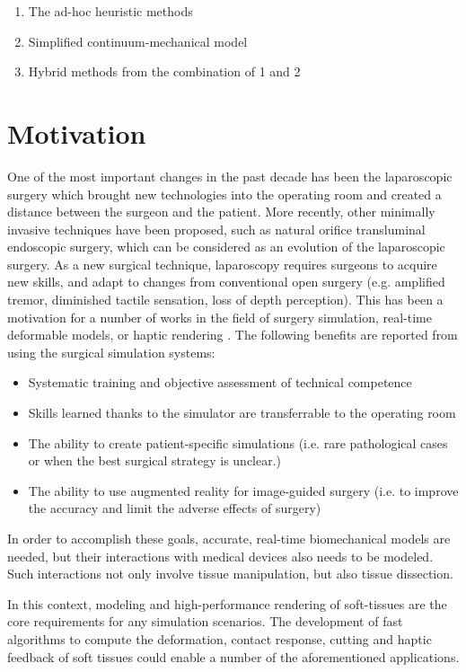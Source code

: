 \begin{enumerate}
 \item The ad-hoc heuristic methods
 \item Simplified continuum-mechanical model
 \item Hybrid methods from the combination of 1 and 2
\end{enumerate}

\section{Motivation}
One of the most important changes in the past decade has been the laparoscopic surgery which brought new technologies into the operating room and created a 
distance between the surgeon and the patient. More recently, other minimally invasive techniques have been proposed, such as natural orifice transluminal 
endoscopic surgery, which can be considered as an evolution of the laparoscopic surgery. As a new surgical technique, laparoscopy requires surgeons to acquire 
new skills, and adapt to changes from conventional open surgery (e.g. amplified tremor, diminished tactile sensation, loss of depth perception). This has been 
a motivation for a number of works in the field of surgery simulation, real-time deformable models, or haptic rendering \cite{Lin2004}. The following benefits are reported
from using the surgical simulation systems:

\begin{itemize}
 \item Systematic training and objective assessment of technical competence
 \item Skills learned thanks to the simulator are transferrable to the operating room
 \item The ability to create patient-specific simulations (i.e. rare pathological cases or when the best surgical strategy is unclear.)
 \item The ability to use augmented reality for image-guided surgery (i.e. to improve the accuracy and limit the adverse effects of surgery)
\end{itemize}

In order to accomplish these goals, accurate, real-time biomechanical models are needed, but their interactions with medical devices also needs to be modeled.
Such interactions not only involve tissue manipulation, but also tissue dissection. 

In this context, modeling and high-performance rendering of soft-tissues are the core requirements for any simulation scenarios. 
The development of fast algorithms to compute the deformation, contact response, cutting and haptic feedback of soft tissues could enable a number of the 
aforementioned applications.

